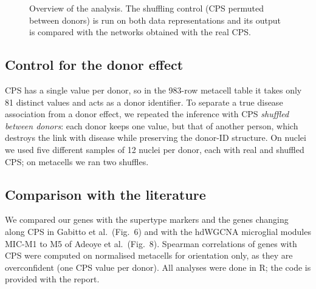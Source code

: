 \begin{figure}[ht]
\centering
{}
\caption{Overview of the analysis. The shuffling control (CPS permuted between donors) is run on both data representations and its output is compared with the networks obtained with the real CPS.}\label{fig:pipeline}
\end{figure}

\subsection{Control for the donor effect}
CPS has a single value per donor, so in the 983-row metacell table it takes only 81 distinct values and acts as a donor identifier. To separate a true disease association from a donor effect, we repeated the inference with CPS \emph{shuffled between donors}: each donor keeps one value, but that of another person, which destroys the link with disease while preserving the donor-ID structure. On nuclei we used five different samples of 12 nuclei per donor, each with real and shuffled CPS; on metacells we ran two shuffles.

\subsection{Comparison with the literature}
We compared our genes with the supertype markers and the genes changing along CPS in Gabitto et al.\ (Fig.~6) and with the hdWGCNA microglial modules MIC-M1 to M5 of Adeoye et al.\ (Fig.~8). Spearman correlations of genes with CPS were computed on normalised metacells for orientation only, as they are overconfident (one CPS value per donor). All analyses were done in R; the code is provided with the report.

